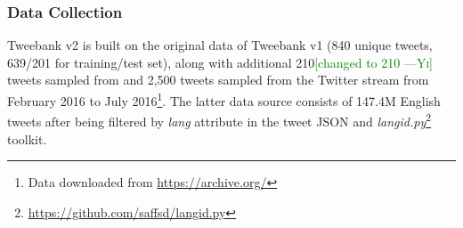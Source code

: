 \documentclass[11pt,a4paper]{article}
\newcommand{\yicomment}[1]{\textcolor{green}{[#1 ---\textsc{Yi}]}}
\begin{document}
\subsubsection{Data Collection}
{\sc Tweebank v2} is built on the original data of {\sc Tweebank v1} (840 unique tweets, 639/201 for training/test set), along with additional 210\yicomment{changed to 210} tweets sampled from  and 2,500 tweets sampled from the Twitter stream from February 2016 to July 2016\footnote{Data downloaded from \url{https://archive.org/}}.
The latter data source consists of 147.4M English tweets after being filtered by {\it lang} attribute in the tweet JSON and {\it langid.py}\footnote{\url{https://github.com/saffsd/langid.py}} toolkit.

\end{document}
